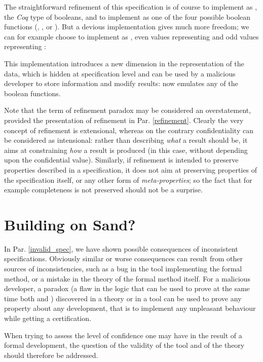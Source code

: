\documentclass[conference]{IEEEtran}
\begin{document}
The straightforward refinement of this specification is of course to implement {\small} as
{\small}, the \emph{Coq} type of booleans, and to implement {\small} as one
of the four possible boolean functions ({\small}, {\small},
{\small} or {\small}). But a devious implementation gives much more
freedom; we can for example choose to implement {\small} as {\small}, even values
representing {\small} and odd values representing {\small}:

This implementation introduces a new dimension in the representation of the data, which is
hidden at specification level and can be used by a malicious developer to store information
and modify results: {\small} now emulates any of the boolean functions.

Note that the term of refinement paradox may be considered an overstatement, provided the
presentation of refinement in Par. \ref{refinement}. Clearly the very concept of refinement is
extensional, whereas on the contrary confidentiality can be considered as intensional: rather
than describing \emph{what} a result should be, it aims at constraining \emph{how} a result is
produced (in this case, without depending upon the confidential value). Similarly, if
refinement is intended to preserve properties described in a specification, it does not aim at
preserving properties of the specification itself, or any other form of
\emph{meta-properties}; so the fact that for example completeness is not preserved should not
be a surprise.

\section{Building on Sand?}\label{building_sand}

In Par. \ref{invalid_spec}, we have shown possible consequences of inconsistent
specifications. Obviously similar or worse consequences can result from other sources of
inconsistencies, such as a bug in the tool implementing the formal method, or a mistake in the
theory of the formal method itself. For a malicious developer, a paradox (a flaw in the logic
that can be used to prove at the same time both {\small} and {\small}) discovered
in a theory or in a tool can be used to prove any property about any development, that is to
implement any unpleasant behaviour while getting a certification.

When trying to assess the level of confidence one may have in the result of a formal
development, the question of the validity of the tool and of the theory should therefore be
addressed.
\end{document}
